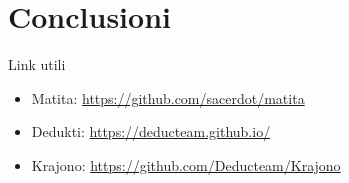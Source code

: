 \documentclass{beamer}
\begin{document}
\section{Conclusioni}
\begin{frame}{Link utili}

\begin{itemize}
  \item \alert{Matita}: \href{https://github.com/sacerdot/matita}{https://github.com/sacerdot/matita}
  \vspace{1em}
  \item \alert{Dedukti}: \href{https://deducteam.github.io/}{https://deducteam.github.io/}
  \vspace{1em}
  \item \alert{Krajono}: \href{https://github.com/Deducteam/Krajono}{https://github.com/Deducteam/Krajono}
  \vspace{1em}
\end{itemize}
\end{frame}
\end{document}
